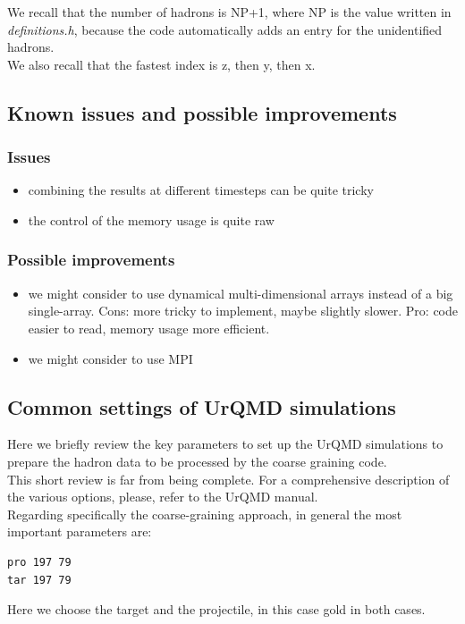 \documentclass[12pt, a4paper]{article}
\begin{document}
We recall that the number of hadrons is NP+1, where NP is the value written in \emph{definitions.h}, because the code automatically adds an entry for the unidentified hadrons.\\
We also recall that the fastest index is z, then y, then x.\\


\subsection{Known issues and possible improvements}
\subsubsection{Issues}
\begin{itemize}
	\item combining the results at different timesteps can be quite tricky
	\item the control of the memory usage is quite raw
\end{itemize}

\subsubsection{Possible improvements}
\begin{itemize}
	\item we might consider to use dynamical multi-dimensional arrays instead of a big single-array. Cons: more tricky to implement, maybe slightly slower. Pro: code easier to read, memory usage more efficient.
	\item we might consider to use MPI	
\end{itemize}

\subsection{Common settings of UrQMD simulations}
Here we briefly review the key parameters to set up the UrQMD simulations to prepare the hadron data to be processed by the coarse graining code.\\
This short review is far from being complete. For a comprehensive description of the various options, please, refer to the UrQMD manual.\\
Regarding specifically the coarse-graining approach, in general the most important parameters are:\\

\begin{verbatim}
pro 197 79
tar 197 79
\end{verbatim}
Here we choose the target and the projectile, in this case gold in both cases.\\
\end{document}
